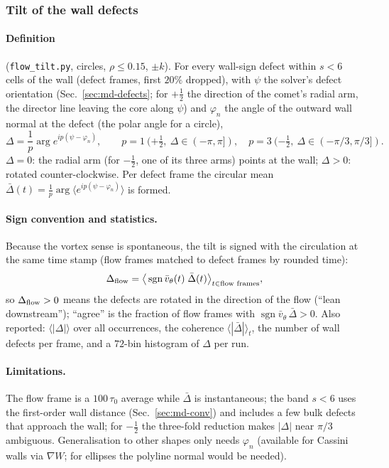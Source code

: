 \subsubsection{Tilt of the wall defects}
\label{sec:md-tilt}

\paragraph{Definition} (\texttt{flow\_tilt.py}, circles, $\rho\le0.15$, $\pm k$). For every wall-sign defect within $s<6$ cells of the wall
(defect frames, first $20\%$ dropped), with $\psi$ the solver's defect orientation (Sec.~\ref{sec:md-defects}; for $+\tfrac12$ the direction
of the comet's radial arm, the director line leaving the core along $\psi$) and $\varphi_n$ the angle of the outward wall normal at the defect
(the polar angle for a circle),
\begin{equation}
  \Delta=\frac1p\arg e^{ip(\psi-\varphi_n)},\qquad p=1\ (+\tfrac12,\ \Delta\in(-\pi,\pi]),\quad p=3\ (-\tfrac12,\ \Delta\in(-\pi/3,\pi/3]).
\end{equation}
$\Delta=0$: the radial arm (for $-\tfrac12$, one of its three arms) points at the wall; $\Delta>0$: rotated counter-clockwise.
Per defect frame the circular mean $\bar\Delta(t)=\frac1p\arg\langle e^{ip(\psi-\varphi_n)}\rangle$ is formed.
\paragraph{Sign convention and statistics.} Because the vortex sense is spontaneous, the tilt is signed with the circulation at the same time
stamp (flow frames matched to defect frames by rounded time):
\begin{equation}
  \Delta_{\rm flow}=\big\langle\operatorname{sgn}\bar v_\theta(t)\;\bar\Delta(t)\big\rangle_{t\in\text{flow frames}},
\end{equation}
so $\Delta_{\rm flow}>0$ means the defects are rotated in the direction of the flow (``lean downstream''); ``agree'' is the fraction of flow frames
with $\operatorname{sgn}\bar v_\theta\,\bar\Delta>0$. Also reported: $\langle|\Delta|\rangle$ over all occurrences, the coherence
$\langle|\bar\Delta|\rangle_t$, the number of wall defects per frame, and a $72$-bin histogram of $\Delta$ per run.
\paragraph{Limitations.} The flow frame is a $100\,\tau_0$ average while $\bar\Delta$ is instantaneous; the band $s<6$ uses the first-order wall
distance (Sec.~\ref{sec:md-conv}) and includes a few bulk defects that approach the wall; for $-\tfrac12$ the three-fold reduction makes
$|\Delta|$ near $\pi/3$ ambiguous. Generalisation to other shapes only needs $\varphi_n$ (available for Cassini walls via $\nabla W$; for
ellipses the polyline normal would be needed).

